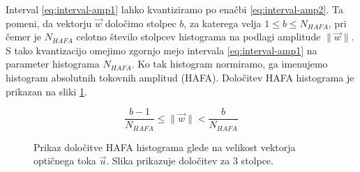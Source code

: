 Interval \eqref{eq:interval-amp1} lahko kvantiziramo po enačbi \eqref{eq:interval-amp2}. Ta pomeni, da vektorju $\vec{w}$ določimo stolpec $b$, za katerega velja $1 \leq b \leq N_{HAFA}$, pri čemer je $N_{HAFA}$ celotno število stolpcev histograma na podlagi amplitude $\| \vec{w} \|$. S tako kvantizacijo omejimo zgornjo mejo intervala \eqref{eq:interval-amp1} na parameter histograma $N_{HAFA}$. Ko tak histogram normiramo, ga imenujemo histogram absolutnih tokovnih amplitud (HAFA). Določitev HAFA histograma je prikazan na sliki \ref{fig:hafa-histogram}.

\begin{equation}\label{eq:interval-amp2}
	\frac{b-1}{N_{HAFA}} \leq \| \vec{w} \| < \frac{b}{N_{HAFA}}
\end{equation}




\begin{figure}[!htb]
\centering

\caption[Prikaz določitve HAFA histograma glede na velikost vektorja]{Prikaz določitve HAFA histograma glede na velikost vektorja optičnega toka $\vec{u}$. Slika prikazuje določitev za $3$ stolpce.}
\label{fig:hafa-histogram}
\end{figure}